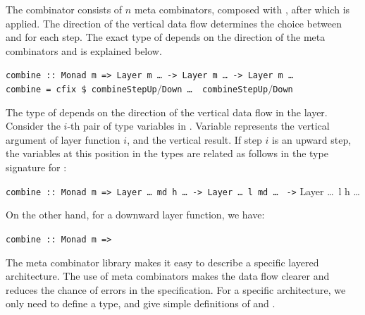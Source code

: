 \documentclass{llncs}
\begin{document}
The  combinator consists of $n$  meta combinators, composed with , after which  is applied. The direction of the vertical data flow determines the choice between  and  for each step.  The exact type of  depends on the direction of the meta combinators and is explained below. 

\begin{small}
\begin{tabbing}
{\tt combine}\verb| :: |\={\tt Monad m => Layer m \dots}\verb| -> |{\tt Layer m \dots}\verb| -> |{\tt Layer m \dots }\\
{\tt co}\={\tt mbine}\={\tt ~=  cfix \$ combineStepUp$/$Down \dots \ \ combineStepUp$/$Down}
\end{tabbing}%
\end{small}

The type of  depends on the direction of the vertical data flow in the layer. Consider the $i$-th pair of  type variables in . Variable  represents the vertical argument of layer function $i$, and  the vertical result. If step $i$ is an upward step, the variables at this position in the  types are related as follows in the type signature for :

\begin{small}
\begin{tabbing}
{\tt  combine :: }\={\tt Monad m => Layer \dots~md h \dots}\verb| -> |{\tt Layer \dots~l~md \dots} \verb| ->| Layer \dots~l h \dots
\end{tabbing}
\end{small}

On the other hand, for a downward layer function, we have:

\begin{small}
\begin{tabbing}
{\tt  combine :: }\={\tt Monad m =>}\\
\end{tabbing}
\end{small}

The meta combinator library makes it easy to describe a specific layered architecture. The use of meta combinators makes the data flow clearer and reduces the chance of errors in the specification. For a specific architecture, we only need to define a  type, and give simple definitions of  and .
\end{document}
